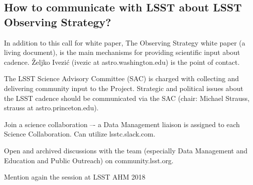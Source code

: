 \documentclass[DM,lsstdraft,toc,usenatbib]{lsstdoc}
\begin{document}
\subsection{How to communicate with LSST about LSST Observing Strategy?} 

In addition to this call for white paper, The Observing Strategy white paper (a living document), 
is the main mechanisms for providing scientific input about cadence. 
\v{Z}eljko Ivezi\'{c} (ivezic at astro.washington.edu) is the point of contact.

The LSST Science Advisory Committee (SAC) is charged with collecting and delivering 
community input to the Project. Strategic and political issues about the LSST cadence should 
be communicated via the SAC (chair: Michael Strauss, strauss at astro.princeton.edu).

Join a science collaboration –- a Data Management liaison is assigned to each Science Collaboration.
Can utilize lsstc.slack.com.

Open and archived discussions with the team (especially Data Management and Education and 
Public Outreach) on community.lsst.org.

Mention again the session at LSST AHM 2018 
\end{document}
